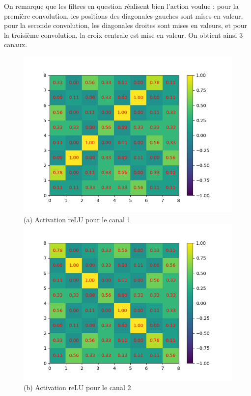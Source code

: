 On remarque que les filtres en question réalisent bien l'action voulue : pour la première convolution, les positions des 
diagonales gauches sont mises en valeur, pour la seconde convolution, les diagonales droites sont mises en valeurs, 
et pour la troisième convolution, la croix centrale est mise en valeur. On obtient ainsi 3 canaux.
\begin{figure}[h]
        \includegraphics[width=\textwidth]{img/cnn_exemple/cross/activation_relu_1.png}
        \center
        (a) Activation reLU pour le canal 1
    \endminipage\hfill
        \includegraphics[width=\textwidth]{img/cnn_exemple/cross/activation_relu_2.png}
        \center
        (b) Activation reLU pour le canal 2

\end{figure}
